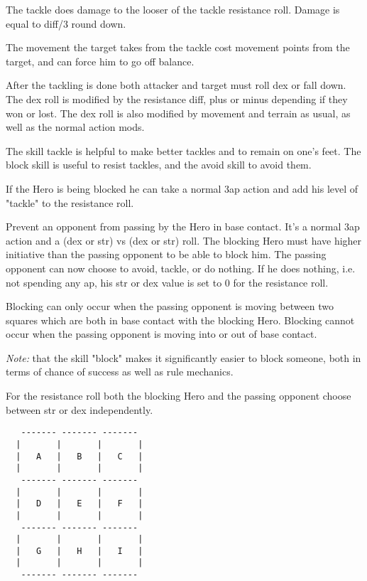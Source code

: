The tackle does damage to the looser of the tackle resistance roll. Damage is equal to diff/3 round down.

The movement the target takes from the tackle cost movement points from the target, and can force him to go off balance.

After the tackling is done both attacker and target must roll dex or fall down. The dex roll is modified by the resistance diff, plus or minus depending if they won or lost. The dex roll is also modified by movement and terrain as usual, as well as the normal action mods.

The skill tackle is helpful to make better tackles and to remain on one's feet. The block skill is useful to resist tackles, and the avoid skill to avoid them.

If the Hero is being blocked he can take a normal 3ap action and add his level of "tackle" to the resistance roll.


 Prevent an opponent from passing by the Hero in base contact. It's a normal 3ap action and a (dex or str) vs (dex or str) roll. The blocking Hero must have higher initiative than the passing opponent to be able to block him. The passing opponent can now choose to avoid, tackle, or do nothing. If he does nothing, i.e. not spending any ap, his str or dex value is set to 0 for the resistance roll.

Blocking can only occur when the passing opponent is moving between two squares which are both in base contact with the blocking Hero. Blocking cannot occur when the passing opponent is moving into or out of base contact.

\emph{Note:} that the skill "block" makes it significantly easier to block someone, both in terms of chance of success as well as rule mechanics.

For the resistance roll both the blocking Hero and the passing opponent choose between str or dex independently.

\begin{samepage} \goodbreak
\scriptsize \begin{verbatim}
   ------- ------- -------
  |       |       |       |
  |   A   |   B   |   C   |
  |       |       |       |
   ------- ------- -------
  |       |       |       |
  |   D   |   E   |   F   |
  |       |       |       |
   ------- ------- -------
  |       |       |       |
  |   G   |   H   |   I   |
  |       |       |       |
   ------- ------- -------
\end{verbatim} \normalsize
\end{samepage}

